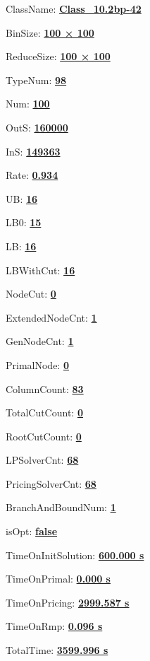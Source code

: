 \documentclass[11pt]{article}
\begin{document}
\pagestyle{empty}


ClassName: \underline{\textbf{Class_10.2bp-42}}
\par
BinSize: \underline{\textbf{100 × 100}}
\par
ReduceSize: \underline{\textbf{100 × 100}}
\par
TypeNum: \underline{\textbf{98}}
\par
Num: \underline{\textbf{100}}
\par
OutS: \underline{\textbf{160000}}
\par
InS: \underline{\textbf{149363}}
\par
Rate: \underline{\textbf{0.934}}
\par
UB: \underline{\textbf{16}}
\par
LB0: \underline{\textbf{15}}
\par
LB: \underline{\textbf{16}}
\par
LBWithCut: \underline{\textbf{16}}
\par
NodeCut: \underline{\textbf{0}}
\par
ExtendedNodeCnt: \underline{\textbf{1}}
\par
GenNodeCnt: \underline{\textbf{1}}
\par
PrimalNode: \underline{\textbf{0}}
\par
ColumnCount: \underline{\textbf{83}}
\par
TotalCutCount: \underline{\textbf{0}}
\par
RootCutCount: \underline{\textbf{0}}
\par
LPSolverCnt: \underline{\textbf{68}}
\par
PricingSolverCnt: \underline{\textbf{68}}
\par
BranchAndBoundNum: \underline{\textbf{1}}
\par
isOpt: \underline{\textbf{false}}
\par
TimeOnInitSolution: \underline{\textbf{600.000 s}}
\par
TimeOnPrimal: \underline{\textbf{0.000 s}}
\par
TimeOnPricing: \underline{\textbf{2999.587 s}}
\par
TimeOnRmp: \underline{\textbf{0.096 s}}
\par
TotalTime: \underline{\textbf{3599.996 s}}
\par
\newpage


\end{document}
